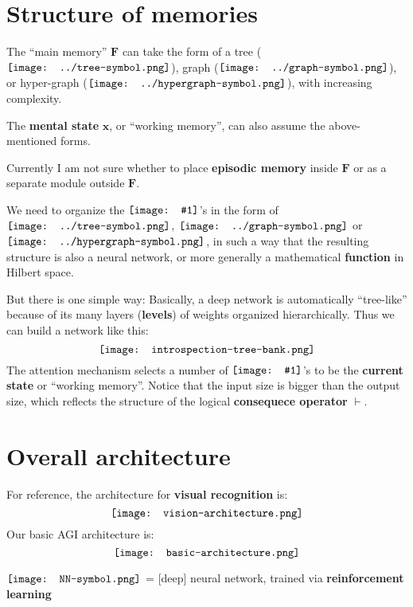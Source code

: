 \documentclass[orivec]{llncs}
\newcommand{\vect}[1]{\boldsymbol{#1}}
\newcommand*\NN{\vcenter{\hbox{\texttt{[image: NN-symbol.png]}}}}
\newcommand*\Graph{\vcenter{\hbox{\texttt{[image: ../graph-symbol.png]}}}}
\newcommand*\Hypergraph{\vcenter{\hbox{\texttt{[image: ../hypergraph-symbol.png]}}}}
\newcommand*\Tree{\vcenter{\hbox{\texttt{[image: ../tree-symbol.png]}}}}
\newcommand*\NewSym[1]{\vcenter{\hbox{\texttt{[image: \#1]}}}}
\begin{document}
\section{Structure of memories}

The ``main memory'' $\vect{F}$ can take the form of a tree ($\Tree$), graph ($\Graph$), or hyper-graph ($\Hypergraph$), with increasing complexity.

The \textbf{mental state} $\vect{x}$, or ``working memory'', can also assume the above-mentioned forms.

Currently I am not sure whether to place \textbf{episodic memory} inside $\vect{F}$ or as a separate module outside $\vect{F}$.

We need to organize the $\NewSym{strand.png}$'s in the form of $\Tree$, $\Graph$ or $\Hypergraph$, in such a way that the resulting structure is also a neural network, or more generally a mathematical \textbf{function} in Hilbert space.

But there is one simple way:  Basically, a deep network is automatically ``tree-like'' because of its many layers (\textbf{levels}) of weights organized hierarchically.  Thus we can build a network like this:
\begin{equation}
\vcenter{\hbox{\texttt{[image: introspection-tree-bank.png]}}}
\end{equation}
The {\color{red}attention mechanism} selects a number of $\NewSym{strand.png}$'s to be the \textbf{current state} or ``working memory''.  Notice that the input size is bigger than the output size, which reflects the structure of the logical \textbf{consequece operator} $\vdash$.

\section{Overall architecture}

For reference, the architecture for \textbf{visual recognition} is:
\begin{equation}
\vcenter{\hbox{\texttt{[image: vision-architecture.png]}}}
\end{equation}
Our basic AGI architecture is:
\begin{equation}
\vcenter{\hbox{\texttt{[image: basic-architecture.png]}}}
\label{basic-arch}
\end{equation}

$\NN$ = [deep] neural network, trained via \textbf{reinforcement learning}
\end{document}
